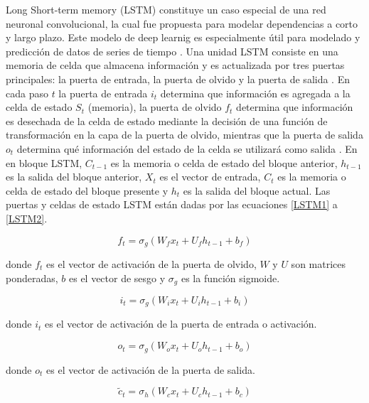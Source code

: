 Long Short-term memory (LSTM) constituye un caso especial de una red neuronal convolucional, la cual fue propuesta para modelar dependencias a corto y largo plazo. Este modelo de deep learnig es especialmente útil para modelado y predicción de datos de series de tiempo \cite{mudassirTimeseriesForecastingBitcoin2020}.
Una unidad LSTM consiste en una memoria de celda que almacena información y es actualizada por tres puertas principales: la puerta de entrada, la puerta de olvido y la puerta de salida \cite{chenBitcoinPricePrediction2020}.
En cada paso $t$ la puerta de entrada $i_t$ determina que información es agregada a la celda de estado $S_t$ (memoria), la puerta de olvido $f_t$ determina que información es desechada de la celda de estado mediante la decisión de una función de transformación en la capa de la puerta de olvido, mientras que la puerta de salida $o_t$ determina qué información del estado de la celda se utilizará como salida \cite{livierisEnsembleDeepLearning2020}.
En en bloque LSTM, $C_{t-1}$ es la memoria o celda de estado del bloque anterior, $h_{t-1}$ es la salida del bloque anterior, $X_t$ es el vector de entrada, $C_t$  es la memoria o celda de estado del bloque presente y  $h_{t}$ es la salida del bloque actual.
Las puertas y celdas de estado LSTM están dadas por las ecuaciones \ref{LSTM1} a \ref{LSTM2}.

\begin{equation}
	f_{t}=\sigma_{g}\left(W_{f} x_{t}+U_{f} h_{t-1}+b_{f}\right)
	\label{LSTM1}
\end{equation}

donde $f_t$ es el vector de activación de la puerta de olvido, $W$ y $U$ son matrices ponderadas, $b$ es el vector de sesgo y $\sigma_{g}$ es la función sigmoide. 

\begin{equation}
	i_{t}=\sigma_{g}\left(W_{i} x_{t}+U_{i} h_{t-1}+b_{i}\right)
\end{equation}

donde $i_t$ es el vector de activación de la puerta de entrada o activación.

\begin{equation}
	o_{t}=\sigma_{g}\left(W_{o} x_{t}+U_{o} h_{t-1}+b_{o}\right)
\end{equation}

donde $o_t$ es el vector de activación de la puerta de salida.

\begin{equation}
	\tilde{c}_{t}=\sigma_{h}\left(W_{c} x_{t}+U_{c} h_{t-1}+b_{c}\right)
\end{equation}

